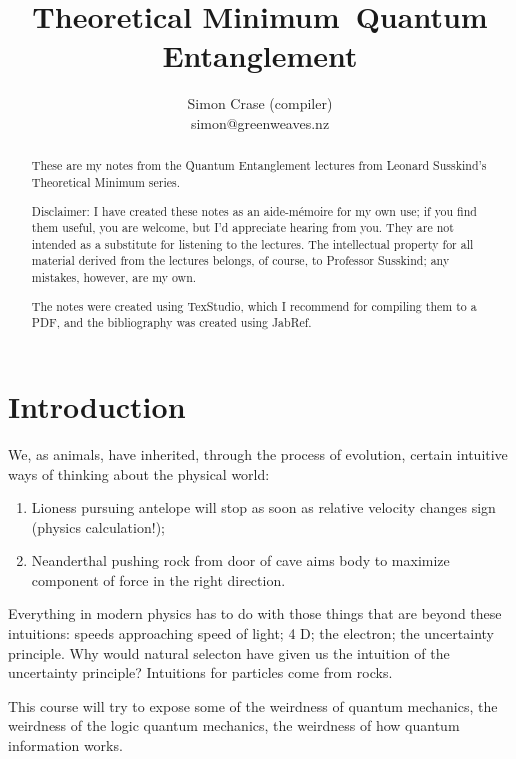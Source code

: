 \documentclass[]{article}
\title{Theoretical Minimum\ Quantum Entanglement}
\author{Simon Crase (compiler)\\simon@greenweaves.nz}
\begin{document}
\maketitle

\begin{abstract}
These are my notes from the Quantum Entanglement lectures\cite{susskind2013entanglement}  from Leonard Susskind's Theoretical Minimum series\cite{susskind2007theoretical}.

Disclaimer: I have created these notes as an aide-m\'emoire for my own use; if you find them useful, you are welcome, but I'd appreciate hearing from you. They are not intended 
as a substitute for listening to the lectures. The intellectual property for all material derived from the lectures belongs, of course, to Professor Susskind; any mistakes, however, are my own.

The notes were created using TexStudio\cite{TexStudio}, which I recommend for compiling them to a PDF, and the bibliography was created using JabRef\cite{Jabref}.

\end{abstract}

\tableofcontents
\listoffigures
\listoftables
\listoftheorems


\section{Introduction}


We, as animals, have inherited, through the process of evolution, certain intuitive ways of thinking about the physical world:
\begin{enumerate}
	\item Lioness pursuing antelope will stop as soon as relative velocity changes sign (physics calculation!);
	\item Neanderthal pushing rock from door of cave aims body to maximize component of force in the right direction.
\end{enumerate}

Everything in modern physics has to do with those things that are beyond these intuitions:
speeds approaching speed of light; 4 D; the electron; the uncertainty principle. Why would natural selecton have given us the intuition of the uncertainty principle? Intuitions for particles come from rocks.

This course will try to expose some of the weirdness of quantum mechanics, the weirdness of the logic quantum mechanics, the weirdness of how quantum information works. 
\end{document}
